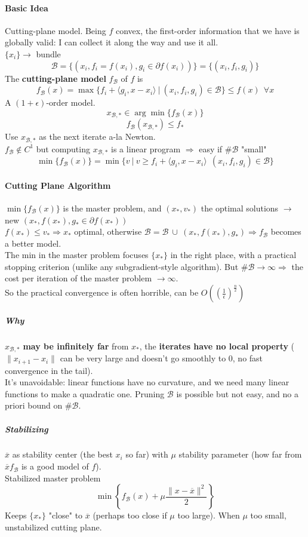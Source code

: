 \documentclass[10pt]{report}
\begin{document}
\paragraph{Basic Idea} Cutting-plane model. Being $f$ convex, the first-order information that we have is globally valid: I can collect it along the way and use it all.\\
$\{x_i\}\rightarrow$ bundle $$\mathscr{B}=\{(x_i, f_i = f(x_i), g_i\in\partial f(x_i))\} = \{(x_i, f_i, g_i)\}$$
The \textbf{cutting-plane model} $f_\mathscr{B}$ of $f$ is $$f_\mathscr{B}(x) = \max\{f_i+\langle g_i, x-x_i\rangle\:|\:(x_i, f_i, g_i)\in \mathscr{B}\}\leq f(x)\:\:\forall x$$ A $(1+\epsilon)$-order model.
$$x_{\mathscr{B},*}\in \arg\min\{f_\mathscr{B}(x)\}$$ $$f_\mathscr{B}(x_{\mathscr{B},*})\leq f_*$$ Use $x_{\mathscr{B},*}$ as the next iterate a-la Newton.\\
$f_\mathscr{B}\not\in C^1$ but computing $x_{\mathscr{B},*}$ is a linear program $\Rightarrow$ easy if $\# \mathscr{B}$ "small" $$\min\{f_\mathscr{B}(x)\}=\min\{v\:|\:v\geq f_i+\langle g_i, x-x_i\rangle\:\:(x_i, f_i, g_i)\in \mathscr{B}\}$$
\paragraph{Cutting Plane Algorithm} $\min\{f_\mathscr{B}(x)\}$ is the master problem, and $(x_*, v_*)$ the optimal solutions $\rightarrow$ new $(x_*, f(x_*), g_*\in\partial f(x_*))$\\
$f(x_*)\leq v_*\Rightarrow x_*$ optimal, otherwise $\mathscr{B}= \mathscr{B}\:\cup\:(x_*, f(x_*), g_*)\Rightarrow f_\mathscr{B}$ becomes a better model.\\
The min in the master problem focuses $\{x_*\}$ in the right place, with a practical stopping criterion (unlike any subgradient-style algorithm). But $\#\mathscr{B}\rightarrow\infty\Rightarrow$ the cost per iteration of the master problem $\rightarrow\infty$.\\
So the practical convergence is often horrible, can be $O\left( \left(\frac{1}{\epsilon}\right)^{\frac{n}{2}}\right)$
\subparagraph{Why} $x_{\mathscr{B},*}$ \textbf{may be infinitely far} from $x_*$, the \textbf{iterates have no local property} ($\|x_{i+1}-x_i\|$ can be very large and doesn't go smoothly to $0$, no fast convergence in the tail).\\
It's unavoidable: linear functions have no curvature, and we need many linear functions to make a quadratic one. Pruning $\mathscr{B}$ is possible but not easy, and no a priori bound on $\# \mathscr{B}$.
\subparagraph{Stabilizing} $\overline{x}$ as stability center (the best $x_i$ so far) with $\mu$ stability parameter (how far from $\overline{x} f_\mathscr{B}$ is a good model of $f$).\\
Stabilized master problem $$\min\left\{f_\mathscr{B}(x)+\mu\frac{\|x-\overline{x}\|^2}{2}\right\}$$ Keeps $\{x_*\}$ "close" to $\overline{x}$ (perhaps too close if $\mu$ too large). When $\mu$ too small, unstabilized cutting plane.
\end{document}
